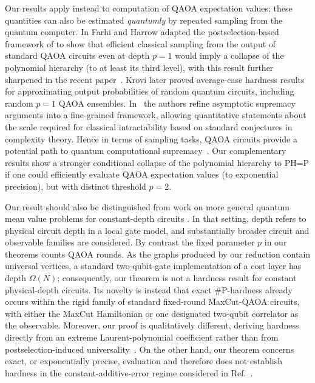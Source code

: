 \documentclass[11pt]{article}
\newcommand{\sh}[1]{{#1}}
\begin{document}
Our results apply %
instead to computation of QAOA expectation values; 
these quantities 
can also be estimated \textit{quantumly} %
by repeated sampling from the quantum computer. 
In \cite{farhi2016quantum}
Farhi and Harrow %
adapted the postselection-based %
framework of \cite{bremner2011classical}
to show that efficient classical sampling from the output of standard %
QAOA circuits 
even at depth $p=1$ 
would imply a collapse of the polynomial hierarchy (to at least its third level), 
with this result further sharpened in the recent paper~\cite{abolicnvs2026sharp}. 
    Krovi later proved average-case hardness results~\cite{krovi2022average} for approximating output probabilities of random
    quantum circuits, including random $p=1$ QAOA ensembles.
In~\cite{dalzell2020many}
    the authors refine asymptotic supremacy arguments into a fine-grained framework, allowing 
    quantitative statements about the scale required for classical intractability based on standard conjectures in complexity theory. 
Hence in terms of sampling tasks, QAOA circuits provide a potential path to quantum computational supremacy~\cite{farhi2016quantum,harrow2017quantum,dalzell2020many}. Our complementary results show a stronger 
\sh{conditional} collapse of the polynomial hierarchy to PH=P if one could 
efficiently %
evaluate QAOA expectation values (to exponential precision), but with distinct threshold $p=2$. 






Our result should also be distinguished from work on more general
quantum mean value problems for constant-depth circuits
\cite{bravyi2021classical}.  
\sh{In that setting, depth refers to physical circuit depth in a local
gate model, and substantially broader circuit and observable
families are considered. 
By contrast the fixed parameter $p$ in
our theorems counts QAOA rounds.}
\sh{As the graphs produced by our
reduction contain universal vertices, a standard two-qubit-gate
implementation of a cost layer has depth $\Omega(N)$; consequently,
our theorem is not a hardness result for constant physical-depth
circuits.}
\sh{Its novelty is instead that exact $\#\mathrm{P}$-hardness
already occurs within the rigid family of standard fixed-round
MaxCut-QAOA circuits, with either the MaxCut Hamiltonian or one
designated two-qubit correlator as the observable.  Moreover, our
proof is qualitatively different, deriving hardness directly from
an extreme Laurent-polynomial coefficient rather than from
postselection-induced universality~\cite{bremner2011classical,bravyi2021classical}.  On the other hand, our theorem
concerns exact, or exponentially precise, evaluation and therefore
does not establish hardness in the constant-additive-error regime
considered in Ref.~\cite{bravyi2021classical}.}
\end{document}
